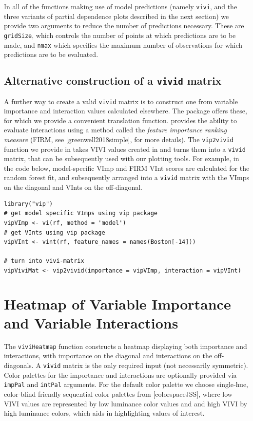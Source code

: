 In all of the  functions making use of model predictions (namely \texttt{vivi}, and the three variants of partial dependence plots described in the next section) we provide two arguments to reduce the number of predictions necessary. These are \texttt{gridSize}, which controls the number of points at which predictions are to be made, and \texttt{nmax} which specifies the maximum number of observations for which predictions are to be evaluated.

\hypertarget{sec:vip2vivid}{%
\subsection{\texorpdfstring{Alternative construction of a \texttt{vivid} matrix}{Alternative construction of a vivid matrix}}\label{sec:vip2vivid}}

A further way to create a valid \texttt{vivid} matrix is to construct one from variable importance and interaction values calculated elsewhere. The package  offers these, for which we provide a convenient translation function.  provides the ability to evaluate interactions using a method called the \emph{feature importance ranking measure} (FIRM, see {[}greenwell2018simple{]}, for more details). The \texttt{vip2vivid} function we provide in  takes VIVI values created in  and turns them into a \texttt{vivid} matrix, that can be subsequently used with our plotting tools. For example, in the code below, model-specific VImp and FIRM VInt scores are calculated for the random forest fit, and subsequently arranged into a \texttt{vivid} matrix with the VImps on the diagonal and VInts on the off-diagonal.

\begin{verbatim}
library("vip")
# get model specific VImps using vip package
vipVImp <- vi(rf, method = 'model')
# get VInts using vip package
vipVInt <- vint(rf, feature_names = names(Boston[-14]))

# turn into vivi-matrix
vipViviMat <- vip2vivid(importance = vipVImp, interaction = vipVInt)
\end{verbatim}

\hypertarget{sec:heatmapSec}{%
\section{Heatmap of Variable Importance and Variable Interactions}\label{sec:heatmapSec}}

The \texttt{viviHeatmap} function constructs a heatmap displaying both importance and interactions, with importance on the diagonal and interactions on the off-diagonals. A \texttt{vivid} matrix is the only required input (not necessarily symmetric). Color palettes for the importance and interactions are optionally provided via \texttt{impPal} and \texttt{intPal} arguments.
For the default color palette we choose single-hue, color-blind friendly sequential color palettes from {[}colorspaceJSS{]}, where low VIVI values are represented by low luminance color values and and high VIVI by high luminance colors, which aids in highlighting values of interest.


